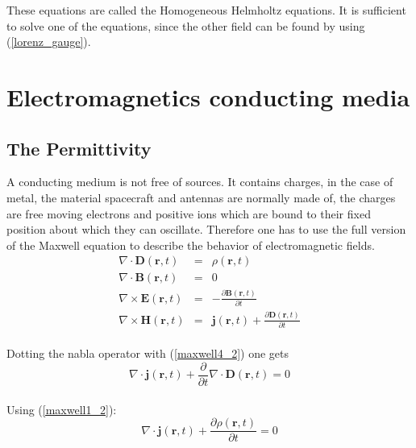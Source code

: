 \documentclass[a4paper,11pt]{thesis}
\begin{document}
These equations are called the Homogeneous Helmholtz equations. It is sufficient to solve one of the equations, since the other field can be found by using (\ref{lorenz_gauge}).


\section{Electromagnetics conducting media}
\subsection{The Permittivity}

A conducting medium is not free of sources. It contains charges, in the case of metal, the material spacecraft and antennas are normally made of, the charges are free moving electrons and positive ions which are bound to their fixed position about which they can oscillate. Therefore one has to use the full version of the Maxwell equation to describe the behavior of electromagnetic fields.\\

\begin{eqnarray}
\nabla \cdot \mathbf{D}(\mathbf{r},t)&=&\rho(\mathbf{r},t) \label{maxwell1_2}\\
\nabla \cdot \mathbf{B}(\mathbf{r},t)&=&0 \label{maxwell2_2} \\
\nabla \times \mathbf{E}(\mathbf{r},t)&=&-\frac{\partial \mathbf{B}(\mathbf{r},t)}{\partial t} \label{maxwell3_2} \\
\nabla \times \mathbf{H}(\mathbf{r},t)&=&\mathbf{j}(\mathbf{r},t)+ \frac{\partial \mathbf{D}(\mathbf{r},t)}{\partial t} \label{maxwell4_2}
\end{eqnarray}\\

Dotting the nabla operator with (\ref{maxwell4_2}) one gets\\

\begin{equation}
   \nabla \cdot \mathbf{j}(\mathbf{r},t)+ \frac{\partial }{\partial t} \nabla \cdot \mathbf{D}(\mathbf{r},t) =0
\end{equation}\\

Using (\ref{maxwell1_2}):\\

\begin{equation}\label{eq:conti}
   \nabla \cdot \mathbf{j}(\mathbf{r},t)+ \frac{\partial \rho(\mathbf{r},t)}{\partial t}  =0
\end{equation}\\
\end{document}
